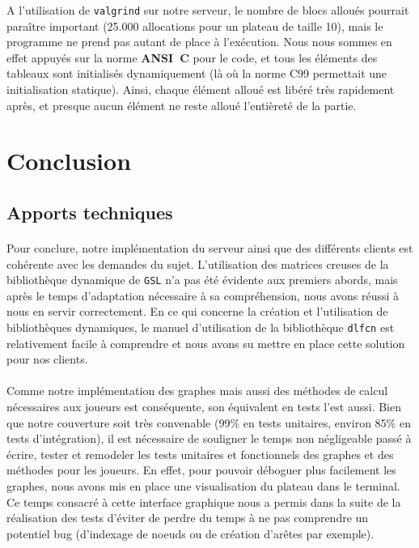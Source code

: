 \documentclass[a4paper]{article}
\begin{document}
A l'utilisation de \texttt{valgrind} sur notre serveur, le nombre de blocs alloués pourrait paraître important (25.000 allocations pour un plateau de taille 10), mais le programme ne prend pas autant de place à l'exécution. Nous nous sommes en effet appuyés sur la norme \textbf{ANSI~C} pour le code, et tous les éléments des tableaux sont initialisés dynamiquement (là où la norme C99 permettait une initialisation statique). Ainsi, chaque élément alloué est libéré très rapidement après, et presque aucun élément ne reste alloué l'entièreté de la partie.

\section{Conclusion}

\subsection{Apports techniques}
\paragraph{}
Pour conclure, notre implémentation du serveur ainsi que des différents clients est cohérente avec les demandes du sujet. L'utilisation des matrices creuses de la bibliothèque dynamique de \texttt{GSL} n'a pas été évidente aux premiers abords, mais après le temps d'adaptation nécessaire à sa compréhension, nous avons réussi à nous en servir correctement. En ce qui concerne la création et l'utilisation de bibliothèques dynamiques, le manuel d'utilisation de la bibliothèque \texttt{dlfcn} est relativement facile à comprendre et nous avons su mettre en place cette solution pour nos clients.

\paragraph{}
Comme notre implémentation des graphes mais aussi des méthodes de calcul nécessaires aux joueurs est conséquente, son équivalent en tests l'est aussi. Bien que notre couverture soit très convenable (99\% en tests unitaires, environ 85\% en tests d'intégration), il est nécessaire de souligner le temps non négligeable passé à écrire, tester et remodeler les tests unitaires et fonctionnels des graphes et des méthodes pour les joueurs. En effet, pour pouvoir déboguer plus facilement les graphes, nous avons mis en place une visualisation du plateau dans le terminal. Ce temps consacré à cette interface graphique nous a permis dans la suite de la réalisation des tests d'éviter de perdre du temps à ne pas comprendre un potentiel bug (d'indexage de noeuds ou de création d'arêtes par exemple).
\end{document}
